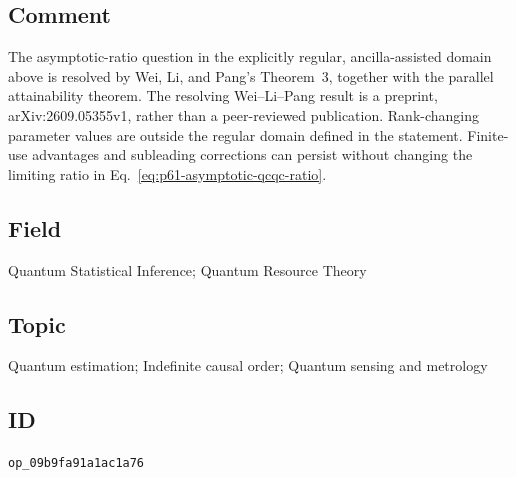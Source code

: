 \subsection*{Comment}

The asymptotic-ratio question in the explicitly regular,
ancilla-assisted domain above is resolved by Wei, Li, and Pang's
Theorem~3, together with the parallel attainability theorem. The resolving
Wei--Li--Pang result is a preprint, arXiv:2609.05355v1, rather than a
peer-reviewed publication. Rank-changing parameter values are outside the
regular domain defined in the statement. Finite-use advantages and
subleading corrections can persist without changing the limiting ratio
in Eq.~\eqref{eq:p61-asymptotic-qcqc-ratio}.

\subsection*{Field}

Quantum Statistical Inference; Quantum Resource Theory

\subsection*{Topic}

Quantum estimation; Indefinite causal order; Quantum sensing and metrology

\subsection*{ID}

\texttt{op\_09b9fa91a1ac1a76}
